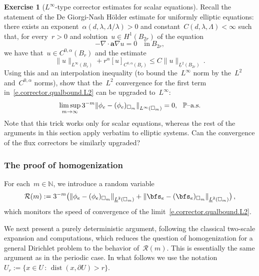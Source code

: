 \documentclass[11pt,twoside]{article} %
\let\oldsquare\square %
\renewcommand{\square}{\oldsquare}
\numberwithin{equation}{section}
\theoremstyle{definition}
\newtheorem{exercise}[theorem]{Exercise}
\let\originalleft\left
\let\originalright\right
\renewcommand{\left}{\mathopen{}\mathclose\bgroup\originalleft}
\renewcommand{\right}{\aftergroup\egroup\originalright}
\newcommand*{\N}{\ensuremath{\mathbb{N}}}
\renewcommand{\a}{\mathbf{a}}
\newcommand{\cu}{\square}
\renewcommand{\P}{\mathbb{P}}
\DeclareMathOperator{\dist}{dist}
\begin{document}
\begin{exercise}[$L^\infty$-type corrector estimates for scalar equations]
Recall the statement of the De Giorgi-Nash H\"older estimate for uniformly elliptic equations: there exists an exponent~$\alpha(d,\lambda,\Lambda/\lambda)>0$ and constant~$C(d,\lambda,\Lambda)<\infty$ such that,  for every~$r>0$ and solution~$u\in H^1(B_{2r})$ of the equation
\begin{equation*}
-\nabla \cdot \a\nabla u = 0 \quad \mbox{in} \ B_{2r}, 
\end{equation*}
we have that~$u \in C^{0,\alpha}(B_r)$ and the estimate
\begin{equation*}
\| u \|_{L^\infty(B_r)} + r^{\alpha} [ u ]_{C^{0,\alpha}(B_r)} 
\leq 
C \| u \|_{\underline{L}^2 (B_{2r})} 
\,.
\end{equation*}
Using this and an interpolation inequality (to bound the~$L^\infty$ norm by the~$L^2$ and~$C^{0,\alpha}$ norms), show that the~$L^2$ convergence for the first term in~\eqref{e.corrector.qualbound.L2} can be upgraded to~$L^\infty$:
\begin{equation}
\label{e.corrector.qualbound.Linfty}
\limsup_{m\to \infty}
3^{-m} 
\left\|  \phi_e - (\phi_e)_{\cu_m} \right\|_{L^\infty(\cu_m)} = 0,
\ \ \mbox{$\P$--a.s.}
\end{equation}
Note that this trick works only for scalar equations, whereas the rest of the arguments in this section apply verbatim to elliptic systems. 
Can the convergence of the flux correctors be similarly upgraded?
\end{exercise}




\subsubsection{The proof of homogenization}

For each~$m\in\N$, we introduce a random variable 
\begin{equation}
\label{e.Rm.def}
\mathcal{R}(m) :=
3^{-m} 
\bigl(
\left\|  \phi_e - (\phi_e)_{\cu_m} \right\|_{\underline{L}^{2}(\cu_m)}
+
\left\|  \bfs_e - (\bfs_e)_{\cu_m} \right\|_{\underline{L}^{2}(\cu_m)}
\bigr) \,,
\end{equation}
which monitors the speed of convergence of the limit~\eqref{e.corrector.qualbound.L2}. 

\smallskip 

We next present a purely deterministic argument, following the classical two-scale expansion and computations, which reduces the question of homogenization for a general Dirichlet problem to the behavior of~$\mathcal{R}(m)$. This is essentially the same argument as in the periodic case. 
In what follows we use the notation~$U_r := \{x \in U \, : \, \dist(x,\partial U)> r\}$.
\end{document}
